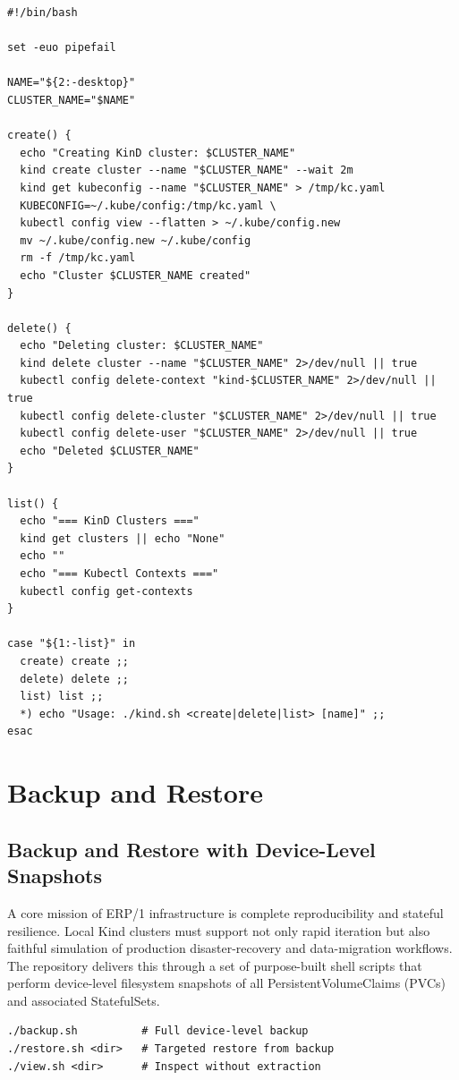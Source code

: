 \documentclass{article}
\begin{document}
\begin{verbatim}
#!/bin/bash

set -euo pipefail

NAME="${2:-desktop}"
CLUSTER_NAME="$NAME"

create() {
  echo "Creating KinD cluster: $CLUSTER_NAME"
  kind create cluster --name "$CLUSTER_NAME" --wait 2m
  kind get kubeconfig --name "$CLUSTER_NAME" > /tmp/kc.yaml
  KUBECONFIG=~/.kube/config:/tmp/kc.yaml \
  kubectl config view --flatten > ~/.kube/config.new
  mv ~/.kube/config.new ~/.kube/config
  rm -f /tmp/kc.yaml
  echo "Cluster $CLUSTER_NAME created"
}

delete() {
  echo "Deleting cluster: $CLUSTER_NAME"
  kind delete cluster --name "$CLUSTER_NAME" 2>/dev/null || true
  kubectl config delete-context "kind-$CLUSTER_NAME" 2>/dev/null || true
  kubectl config delete-cluster "$CLUSTER_NAME" 2>/dev/null || true
  kubectl config delete-user "$CLUSTER_NAME" 2>/dev/null || true
  echo "Deleted $CLUSTER_NAME"
}

list() {
  echo "=== KinD Clusters ==="
  kind get clusters || echo "None"
  echo ""
  echo "=== Kubectl Contexts ==="
  kubectl config get-contexts
}

case "${1:-list}" in
  create) create ;;
  delete) delete ;;
  list) list ;;
  *) echo "Usage: ./kind.sh <create|delete|list> [name]" ;;
esac
\end{verbatim}

\newpage
\section{Backup and Restore}

\subsection{Backup and Restore with Device-Level Snapshots}

A core mission of ERP/1 infrastructure is complete reproducibility and stateful resilience.
Local Kind clusters must support not only rapid iteration but also faithful simulation of
production disaster-recovery and data-migration workflows. The repository delivers this
through a set of purpose-built shell scripts that perform device-level filesystem
snapshots of all PersistentVolumeClaims (PVCs) and associated StatefulSets.

\begin{verbatim}
./backup.sh          # Full device-level backup
./restore.sh <dir>   # Targeted restore from backup
./view.sh <dir>      # Inspect without extraction
\end{verbatim}
\end{document}
